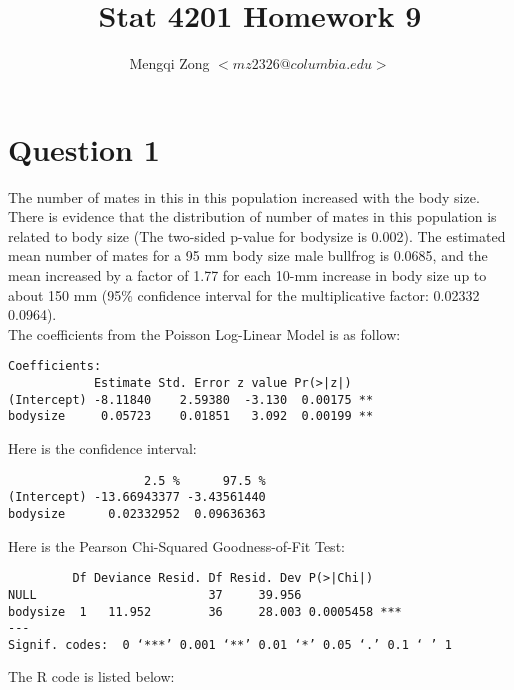 \documentclass[12pt]{article}
\title{Stat 4201 Homework 9}
\author{Mengqi Zong $<mz2326@columbia.edu>$}
\begin{document}
\maketitle

\setlength{\parindent}{0in}

\section*{Question 1}

The number of mates in this in this population increased with the body
size. There is evidence that the distribution of number of mates in
this population is related to body size (The two-sided p-value for
bodysize is 0.002). The estimated mean number of mates for a 95 mm
body size male bullfrog is 0.0685, and the mean increased by a factor
of 1.77 for each 10-mm increase in body size up to about 150 mm (95\%
confidence interval for the multiplicative factor: 0.02332
0.0964). \\


The coefficients from the Poisson Log-Linear Model is as follow:

\begin{verbatim}
Coefficients:
            Estimate Std. Error z value Pr(>|z|)   
(Intercept) -8.11840    2.59380  -3.130  0.00175 **
bodysize     0.05723    0.01851   3.092  0.00199 **
\end{verbatim}

Here is the confidence interval:

\begin{verbatim}
                   2.5 %      97.5 %
(Intercept) -13.66943377 -3.43561440
bodysize      0.02332952  0.09636363
\end{verbatim}

Here is the Pearson Chi-Squared Goodness-of-Fit Test:

\begin{verbatim}
         Df Deviance Resid. Df Resid. Dev P(>|Chi|)    
NULL                        37     39.956              
bodysize  1   11.952        36     28.003 0.0005458 ***
---
Signif. codes:  0 ‘***’ 0.001 ‘**’ 0.01 ‘*’ 0.05 ‘.’ 0.1 ‘ ’ 1 
\end{verbatim}

\appendix
\appendixpage
\addappheadtotoc

The R code is listed below:


\end{document}
